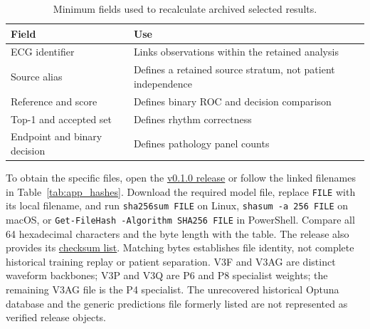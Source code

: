 \documentclass[life,article,submit,moreauthors]{Definitions/mdpi}
\begin{document}
\begin{table}[htbp]
\caption{Minimum fields used to recalculate archived selected results.\label{tab:app_record_schema}}
\centering\small
\begin{tabular}{@{}p{.29\linewidth}p{.64\linewidth}@{}}
\toprule
Field & Use \\
\midrule
ECG identifier & Links observations within the retained analysis \\
Source alias & Defines a retained source stratum, not patient independence \\
Reference and score & Defines binary ROC and decision comparison \\
Top-1 and accepted set & Defines rhythm correctness \\
Endpoint and binary decision & Defines pathology panel counts \\
\bottomrule
\end{tabular}
\end{table}


To obtain the specific files, open the \href{https://github.com/Mateo197802/titan-v45-ecg-multihead/releases/tag/v0.1.0}{v0.1.0 release} or follow the linked filenames in Table~\ref{tab:app_hashes}. Download the required model file, replace \texttt{FILE} with its local filename, and run \texttt{sha256sum FILE} on Linux, \texttt{shasum -a 256 FILE} on macOS, or \texttt{Get-FileHash -Algorithm SHA256 FILE} in PowerShell. Compare all 64 hexadecimal characters and the byte length with the table. The release also provides its \href{https://github.com/Mateo197802/titan-v45-ecg-multihead/releases/download/v0.1.0/SHA256SUMS}{checksum list}. Matching bytes establishes file identity, not complete historical training replay or patient separation. V3F and V3AG are distinct waveform backbones; V3P and V3Q are P6 and P8 specialist weights; the remaining V3AG file is the P4 specialist. The unrecovered historical Optuna database and the generic predictions file formerly listed are not represented as verified release objects.



\end{document}
